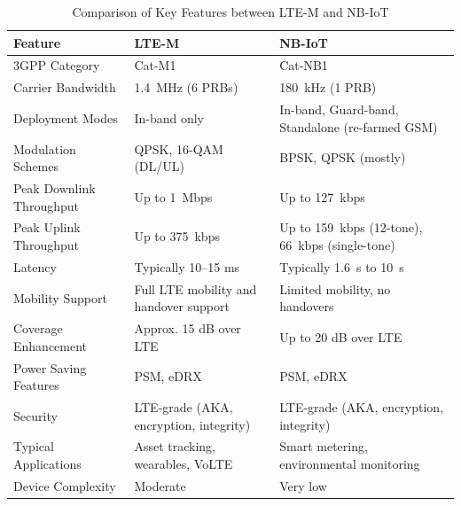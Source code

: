 \documentclass[12pt, english, openany]{book}
\begin{document}
\begin{table}[htbp]
    \centering
    \caption{Comparison of Key Features between LTE-M and NB-IoT}
    \label{tab:ltem_vs_nbiot}
    \begin{tabularx}{\textwidth}{|l|X|X|}
        \hline
        \textbf{Feature}         & \textbf{LTE-M}                         & \textbf{NB-IoT }                                            \\ \hline
        3GPP Category            & Cat-M1                                 & Cat-NB1                                                     \\ \hline
        Carrier Bandwidth        & \SI{1.4}{MHz} (6 PRBs)                 & \SI{180}{kHz} (1 PRB)                                       \\ \hline
        Deployment Modes         & In-band only                           & In-band, Guard-band, Standalone (re-farmed GSM)             \\ \hline
        Modulation Schemes       & QPSK, 16-QAM (DL/UL)                   & BPSK, QPSK (mostly)                                         \\ \hline
        Peak Downlink Throughput & Up to \SI{1}{Mbps}                     & Up to \SI{127}{kbps}                                        \\ \hline
        Peak Uplink Throughput   & Up to \SI{375}{kbps}                   & Up to \SI{159}{kbps} (12-tone), \SI{66}{kbps} (single-tone) \\ \hline
        Latency                  & Typically 10–15 ms                     & Typically \SI{1.6}{s} to \SI{10}{s}                         \\ \hline
        Mobility Support         & Full LTE mobility and handover support & Limited mobility, no handovers                              \\ \hline
        Coverage Enhancement     & Approx. 15 dB over LTE                 & Up to 20 dB over LTE                                        \\ \hline
        Power Saving Features    & PSM, eDRX                              & PSM, eDRX                                                   \\ \hline
        Security                 & LTE-grade (AKA, encryption, integrity) & LTE-grade (AKA, encryption, integrity)                      \\ \hline
        Typical Applications     & Asset tracking, wearables, VoLTE       & Smart metering, environmental monitoring                    \\ \hline
        Device Complexity        & Moderate                               & Very low                                                    \\ \hline
    \end{tabularx}
\end{table}
\end{document}
